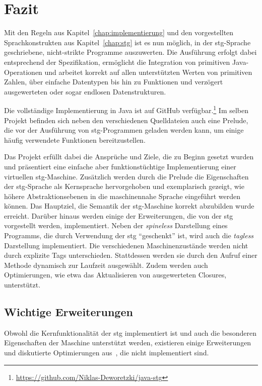 
\chapter{Fazit}\label{chap:ergebnisse}

Mit den Regeln aus Kapitel~\ref{chap:implementierung} und den vorgestellten Sprachkonstrukten aus Kapitel~\ref{chap:stg} ist es nun möglich, in der \gls{stg}-Sprache geschriebene, nicht-strikte Programme auszuwerten.
Die Ausführung erfolgt dabei entsprechend der Spezifikation, ermöglicht die Integration von primitiven Java-Operationen und arbeitet korrekt auf allen unterstützten Werten von primitiven Zahlen, über einfache Datentypen bis hin zu Funktionen und verzögert ausgewerteten oder sogar endlosen Datenstrukturen.

Die vollständige Implementierung in Java ist auf GitHub verfügbar.\footnote{\url{https://github.com/Niklas-Deworetzki/java-stg}}
Im selben Projekt befinden sich neben den verschiedenen Quelldateien auch eine Prelude, die vor der Ausführung von \gls{stg}-Programmen geladen werden kann, um einige häufig verwendete Funktionen bereitzustellen.

Das Projekt erfüllt dabei die Ansprüche und Ziele, die zu Beginn gesetzt wurden und präsentiert eine einfache aber funktionstüchtige Implementierung einer virtuellen \gls{stg}-Maschine.
Zusätzlich werden durch die Prelude die Eigenschaften der \gls{stg}-Sprache als Kernsprache hervorgehoben und exemplarisch gezeigt, wie höhere Abstraktionsebenen in die maschinennahe Sprache eingeführt werden können.
Das Hauptziel, die Semantik der \gls{stg}-Maschine korrekt abzubilden wurde erreicht.
Darüber hinaus werden einige der Erweiterungen, die von der \gls{stg} vorgestellt werden, implementiert.
Neben der \textit{spineless} Darstellung eines Programms, die durch Verwendung der \gls{stg} \enquote{geschenkt} ist, wird auch die \textit{tagless} Darstellung implementiert.
Die verschiedenen Maschinenzustände werden nicht durch explizite Tags unterschieden.
Stattdessen werden sie durch den Aufruf einer Methode dynamisch zur Laufzeit ausgewählt.
Zudem werden auch Optimierungen, wie etwa das Aktualisieren von ausgewerteten Closures, unterstützt.

\section{Wichtige Erweiterungen}

Obwohl die Kernfunktionalität der \gls{stg} implementiert ist und auch die besonderen Eigenschaften der Maschine unterstützt werden, existieren einige Erweiterungen und diskutierte Optimierungen aus~\cite{Jones_StockHardwareSTG}, die nicht implementiert sind.

